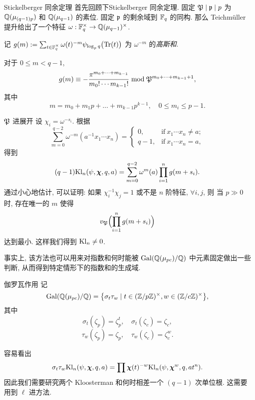 \documentclass[aspectratio=169,handout]{ctexbeamer}
\newcommand\bchi{{\boldsymbol\chi}}
\begin{document}
\begin{frame}{Stickelberger 同余定理}
首先回顾下Stickelberger 同余定理.
固定 ${\mathfrak{P}}\mid {\mathfrak{p}} \mid p$ 为 ${\mathbb{Q}}(\mu_{(q-1)p})$ 和 ${\mathbb{Q}}(\mu_{q-1})$ 的素位.
固定 ${\mathfrak{p}}$ 的剩余域到 ${\mathbb{F}}_q$ 的同构.
那么 Teichm\"uller 提升给出了一个特征 $\omega:{\mathbb{F}}_q^\times\to{\mathbb{Q}}(\mu_{q-1})^\times$.

记 $g(m):=\sum_{t\in{\mathbb{F}}_q^\times}\omega(t)^{-m}\psi_{\log_p q}\bigl({\mathrm{Tr}}(t)\bigr)$ 为 $\omega^{-m}$ 的\emph{高斯和}.

\begin{theorem}
对于 $0\le m<q-1$,
  \[g(m)\equiv -\frac{\pi^{m_0+\dots +m_{k-1}}}{m_0!\cdots m_{k-1}!} \bmod {\mathfrak{P}}^{m_0+\dots+m_{k-1}+1},\]
其中
  \[m=m_0+m_1p+\dots+m_{k-1}p^{k-1},\quad 0\le m_i\le p-1.\]
\end{theorem}
\end{frame}



\begin{frame}{${\mathfrak{P}}$ 进展开}
设 $\chi_i=\omega^{-s_i}$.
根据
\[\sum_{m=0}^{q-2} \omega^{-m}(a^{-1}x_1\cdots x_n)=\begin{cases}
	0,&\text{if}\ x_1\cdots x_n\neq a;\\
	q-1,&\text{if}\ x_1\cdots x_n= a,
\end{cases}\]
得到
\[(q-1)\Kl_n(\psi,\bchi,q,a)=\sum_{m=0}^{q-2}\omega^m(a)\prod_{i=1}^n g(m+s_i).\]
通过小心地估计, 可以证明: 如果 $\chi_i^{-1}\chi_j=1$ 或不是 $n$ 阶特征, $\forall i,j$, 则 当 $p\gg0$ 时, 存在唯一的 $m$ 使得 
\[v_{\mathfrak{P}}\Bigl(\prod_{i=1}^n g(m+s_i)\Bigr)\]
达到最小.
这样我们得到 ${\mathrm{Kl}}_n\neq 0$.

事实上, 该方法也可以用来对指数和何时能被 ${\mathrm{Gal}}({\mathbb{Q}}(\mu_{pc})/{\mathbb{Q}})$ 中元素固定做出一些判断, 从而得到特定情形下的指数和的生成域.
\end{frame}



\begin{frame}{伽罗瓦作用}
记
	\[{\mathrm{Gal}}({\mathbb{Q}}(\mu_{pc})/{\mathbb{Q}})={\left\{\sigma_t\tau_w\mid t\in ({\mathbb{Z}}/p{\mathbb{Z}})^\times,w\in({\mathbb{Z}}/c{\mathbb{Z}})^\times\right\}},\]
其中
	\[\sigma_t(\zeta_p)=\zeta_p^t,\quad \sigma_t(\zeta_c)=\zeta_c,\]
	\[\tau_w(\zeta_p)=\zeta_p,\quad \tau_w(\zeta_c)=\zeta_c^w.\] 

容易看出
	\[\sigma_t\tau_w\Kl_n(\psi,\bchi,q,a)=\prod\bchi(t)^{-w}\Kl_n(\psi,\bchi^w,q,at^n).\]
因此我们需要研究两个 Kloosterman 和何时相差一个 $(q-1)$ 次单位根.
这需要用到 $\ell$ 进方法.
\end{frame}
\end{document}
